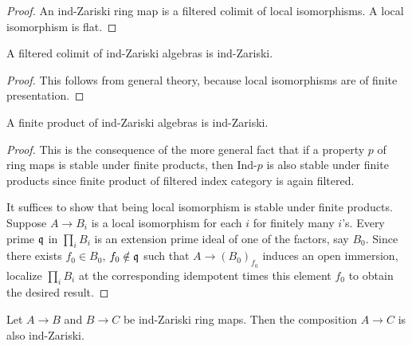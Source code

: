 \begin{proof}
    \leanok
    An ind-Zariski ring map is a filtered colimit of local isomorphisms. A local isomorphism is flat.
\end{proof}

\begin{lemma}
  A filtered colimit of ind-Zariski algebras is ind-Zariski.
  \label{lemma:ind-ind-Zariski}
  \leanok
\end{lemma}

\begin{proof}
    This follows from general theory, because local isomorphisms are of finite presentation.
\end{proof}

\begin{lemma}
  A finite product of ind-Zariski algebras is ind-Zariski.
  \label{lemma:ind-Zariski-products}
  \leanok
\end{lemma}

\begin{proof}
    \leanok
  This is the consequence of the more general fact that if a property $p$ of ring maps is stable
  under finite products, then Ind-$p$ is also stable under finite products since finite product
  of filtered index category is again filtered.

  It suffices to show that being local isomorphism is stable under finite products. Suppose
  $A \to B_i$ is a local isomorphism for each $i$ for finitely many $i$'s. Every prime ${\mathfrak{q}}$ in
  $\prod_i B_i$ is an extension prime ideal of one of the factors, say $B_0$. Since there exists
  $f_0 \in B_0$, $f_0 \notin {\mathfrak{q}}$ such that $A \to (B_0)_{f_0}$ induces an open immersion,
  localize $\prod_i B_i$ at the corresponding idempotent times this element \(f_0\) to obtain
  the desired result.
\end{proof}

\begin{lemma}
  \label{thm:ind-Zariski-composition}
  Let \(A \to B\) and \(B \to C\) be ind-Zariski ring maps. Then the composition \(A \to C\) is also ind-Zariski.
  \leanok
\end{lemma}

